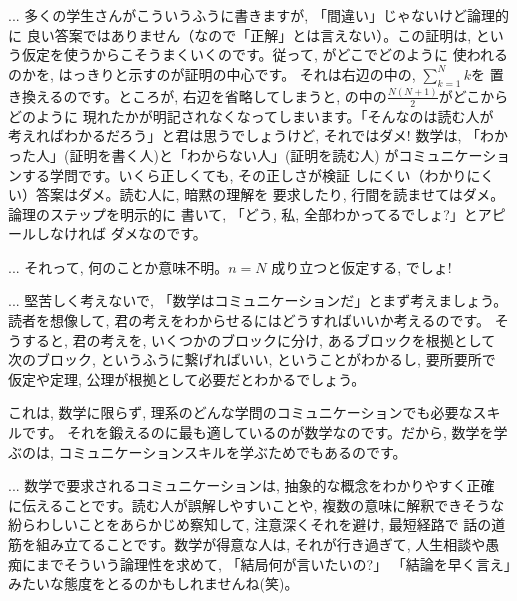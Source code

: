 \begin{freqmiss}{\small{} ...
多くの学生さんがこういうふうに書きますが, 「間違い」じゃないけど論理的に
良い答案ではありません（なので「正解」とは言えない）。この証明は, 
という仮定を使うからこそうまくいくのです。従って, がどこでどのように
使われるのかを, はっきりと示すのが証明の中心です。
それは右辺の中の, $\sum_{k=1}^{N} k$を
置き換えるのです。ところが, 右辺を省略してしまうと, 
の中の$\frac{N(N+1)}{2}$がどこからどのように
現れたかが明記されなくなってしまいます。「そんなのは読む人が
考えればわかるだろう」と君は思うでしょうけど, それではダメ! 数学は, 
「わかった人」(証明を書く人)と「わからない人」(証明を読む人)
がコミュニケーションする学問です。いくら正しくても, その正しさが検証
しにくい（わかりにくい）答案はダメ。読む人に, 暗黙の理解を
要求したり, 行間を読ませてはダメ。論理のステップを明示的に
書いて, 「どう, 私, 全部わかってるでしょ?」とアピールしなければ
ダメなのです。}\end{freqmiss}

\begin{freqmiss}{\small{} ... それって, 何のことか意味不明。$n=N$\underline{}
成り立つと仮定する, でしょ!}\end{freqmiss}

\begin{faq}{\small{}
... 堅苦しく考えないで, 「数学はコミュニケーションだ」とまず考えましょう。
読者を想像して, 君の考えをわからせるにはどうすればいいか考えるのです。
そうすると, 君の考えを, いくつかのブロックに分け, あるブロックを根拠として
次のブロック, というふうに繋げればいい, ということがわかるし, 要所要所で
仮定や定理, 公理が根拠として必要だとわかるでしょう。

これは, 数学に限らず, 理系のどんな学問のコミュニケーションでも必要なスキルです。
それを鍛えるのに最も適しているのが数学なのです。だから, 数学を学ぶのは, 
コミュニケーションスキルを学ぶためでもあるのです。}\end{faq}

\begin{faq}{\small{}
... 数学で要求されるコミュニケーションは, 抽象的な概念をわかりやすく正確
に伝えることです。読む人が誤解しやすいことや, 複数の意味に解釈できそうな
紛らわしいことをあらかじめ察知して, 注意深くそれを避け, 最短経路で
話の道筋を組み立てることです。数学が得意な人は, それが行き過ぎて, 
人生相談や愚痴にまでそういう論理性を求めて, 「結局何が言いたいの?」
「結論を早く言え」みたいな態度をとるのかもしれませんね(笑)。
}\end{faq}

